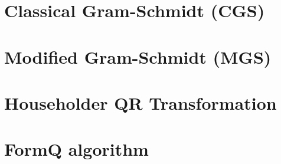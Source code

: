 \documentclass[11pt,a4paper]{article}
\begin{document}
\begin{titlepage}
    \maketitle
\end{titlepage}
%
\newpage
\section{Classical Gram-Schmidt (CGS)}


\newpage
\section{Modified Gram-Schmidt (MGS)}


\newpage
\section{Householder QR Transformation}


\newpage
\section{FormQ algorithm}


\end{document}
